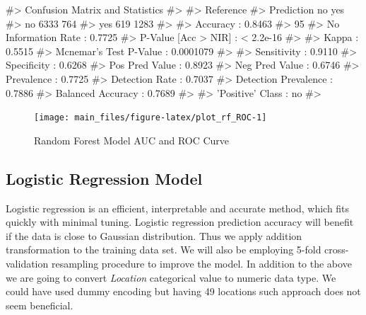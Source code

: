 \begin{Schunk}
\begin{Soutput}
#> Confusion Matrix and Statistics
#> 
#>           Reference
#> Prediction   no  yes
#>        no  6333  764
#>        yes  619 1283
#>                                           
#>                Accuracy : 0.8463          
#>                  95%
#>     No Information Rate : 0.7725          
#>     P-Value [Acc > NIR] : < 2.2e-16       
#>                                           
#>                   Kappa : 0.5515          
#>  Mcnemar's Test P-Value : 0.0001079       
#>                                           
#>             Sensitivity : 0.9110          
#>             Specificity : 0.6268          
#>          Pos Pred Value : 0.8923          
#>          Neg Pred Value : 0.6746          
#>              Prevalence : 0.7725          
#>          Detection Rate : 0.7037          
#>    Detection Prevalence : 0.7886          
#>       Balanced Accuracy : 0.7689          
#>                                           
#>        'Positive' Class : no              
#> 
\end{Soutput}
\end{Schunk}

\begin{Schunk}
\begin{figure}[H]

{\centering \texttt{[image: main\_files/figure-latex/plot\_rf\_ROC-1]} 

}

\caption[Random Forest Model AUC and ROC Curve]{Random Forest Model AUC and ROC Curve}\label{fig:plot_rf_ROC}
\end{figure}
\end{Schunk}

\hypertarget{logistic-regression-model}{%
\subsection{Logistic Regression Model}\label{logistic-regression-model}}

Logistic regression is an efficient, interpretable and accurate method,
which fits quickly with minimal tuning. Logistic regression prediction
accuracy will benefit if the data is close to Gaussian distribution.
Thus we apply addition transformation to the training data set. We will
also be employing 5-fold cross-validation resampling procedure to
improve the model. In addition to the above we are going to convert
\emph{Location} categorical value to numeric data type. We could have
used dummy encoding but having 49 locations such approach does not seem
beneficial.

